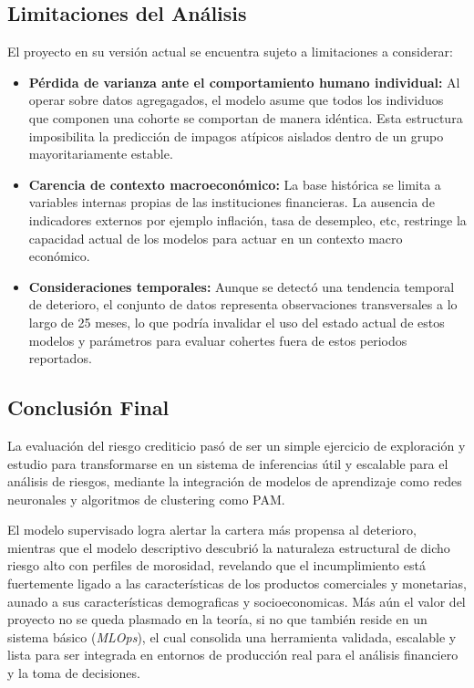 \subsection{Limitaciones del Análisis}
El proyecto en su versión actual se encuentra sujeto a limitaciones a considerar:
\begin{itemize}
	\item \textbf{Pérdida de varianza ante el comportamiento humano individual:} Al operar sobre datos agregagados, el modelo asume que todos los individuos que componen una cohorte se comportan de manera idéntica. Esta estructura imposibilita la predicción de impagos atípicos aislados dentro de un grupo mayoritariamente estable.
	\item \textbf{Carencia de contexto macroeconómico:} La base histórica se limita a variables internas propias de las instituciones financieras. La ausencia de indicadores externos por ejemplo inflación, tasa de desempleo, etc, restringe la capacidad actual de los modelos para actuar en un contexto macro económico.
	\item \textbf{Consideraciones temporales:} Aunque se detectó una tendencia temporal de deterioro, el conjunto de datos representa observaciones transversales a lo largo de 25 meses, lo que podría invalidar el uso del estado actual de estos modelos y parámetros para evaluar cohertes fuera de estos periodos reportados.
\end{itemize}

\subsection{Conclusión Final}
La evaluación del riesgo crediticio pasó de ser un simple ejercicio de exploración y estudio para transformarse en un sistema de inferencias útil y escalable para el análisis de riesgos, mediante la integración de modelos de aprendizaje como redes neuronales y algoritmos de clustering como PAM.

El modelo supervisado logra alertar la cartera más propensa al deterioro, mientras que el modelo descriptivo descubrió la naturaleza estructural de dicho riesgo alto con perfiles de morosidad, revelando que el incumplimiento está fuertemente ligado a las características de los productos comerciales y monetarias, aunado a sus características demograficas y socioeconomicas. Más aún el valor del proyecto no se queda plasmado en la teoría, si no que también reside en un sistema básico (\textit{MLOps}), el cual consolida una herramienta validada, escalable y lista para ser integrada en entornos de producción real para el análisis financiero y la toma de decisiones.